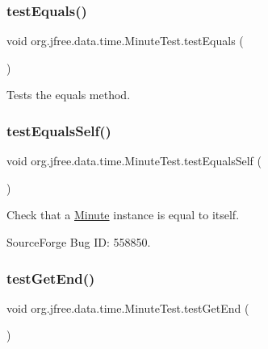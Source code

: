 \subsubsection{\texorpdfstring{test\+Equals()}{testEquals()}}
{\footnotesize\ttfamily void org.\+jfree.\+data.\+time.\+Minute\+Test.\+test\+Equals (\begin{DoxyParamCaption}{ }\end{DoxyParamCaption})}

Tests the equals method. \mbox{\label{classorg_1_1jfree_1_1data_1_1time_1_1_minute_test_aab3bb7558f376d83bc4acebab21cd79b}} 
\subsubsection{\texorpdfstring{test\+Equals\+Self()}{testEqualsSelf()}}
{\footnotesize\ttfamily void org.\+jfree.\+data.\+time.\+Minute\+Test.\+test\+Equals\+Self (\begin{DoxyParamCaption}{ }\end{DoxyParamCaption})}

Check that a \mbox{\hyperlink{classorg_1_1jfree_1_1data_1_1time_1_1_minute}{Minute}} instance is equal to itself.

Source\+Forge Bug ID\+: 558850. \mbox{\label{classorg_1_1jfree_1_1data_1_1time_1_1_minute_test_abf85f1da7ec0efe2bf0a74d0047a36ed}} 
\subsubsection{\texorpdfstring{test\+Get\+End()}{testGetEnd()}}
{\footnotesize\ttfamily void org.\+jfree.\+data.\+time.\+Minute\+Test.\+test\+Get\+End (\begin{DoxyParamCaption}{ }\end{DoxyParamCaption})}

